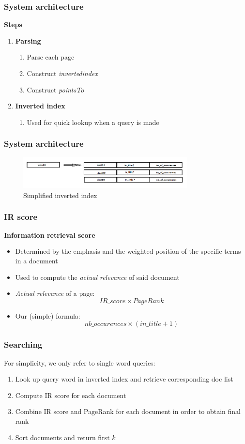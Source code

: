 \documentclass[10pt]{beamer}
\begin{document}
\begin{frame}
  \frametitle{System architecture}
  \textbf{Steps}
  \begin{enumerate}
    \item \textbf{Parsing}
      \begin{enumerate}
        \item Parse each page
        \item Construct \emph{invertedindex}
        \item Construct \emph{pointsTo}
      \end{enumerate}
    \item \textbf{Inverted index}
      \begin{enumerate}
        \item Used for quick lookup when a query is made
      \end{enumerate}
  \end{enumerate}
\end{frame}

\begin{frame}
  \frametitle{System architecture}
  \begin{figure}[h]
    \includegraphics[width=0.8\textwidth]{index.png}
    \caption{Simplified inverted index}
  \end{figure}
\end{frame}

\begin{frame}
  \frametitle{IR score}
  \textbf{Information retrieval score}
  \begin{itemize}
    \item Determined by the emphasis and the weighted position of the specific terms in a document
    \item Used to compute the \emph{actual relevance}  of said document
    \item \emph{Actual relevance} of a page: $$IR\_score \times PageRank$$
    \item Our (simple) formula: $$nb\_occurences \times (in\_title + 1)$$
  \end{itemize}
\end{frame}

\begin{frame}
  \frametitle{Searching}
  For simplicity, we only refer to single word queries:
  \begin{enumerate}
    \item Look up query word in inverted index and retrieve corresponding doc list
    \item Compute IR score for each document
    \item Combine IR score and PageRank for each document in order to obtain final rank
    \item Sort documents and return first $k$
  \end{enumerate}
\end{frame}
\end{document}
